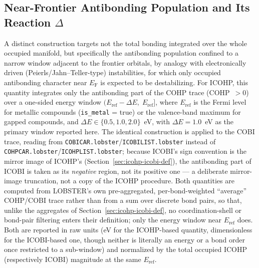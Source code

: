 \documentclass[journal=jpccck,manuscript=article]{achemso}
\begin{document}
\subsection{Near-Frontier Antibonding Population and Its Reaction
$\Delta$}
\label{sec:antibonding-def}

A distinct construction targets not the total bonding integrated over the
whole occupied manifold, but specifically the antibonding population
confined to a narrow window adjacent to the frontier orbitals, by analogy
with electronically driven (Peierls/Jahn--Teller-type) instabilities, for
which only occupied antibonding character near $E_\text{F}$ is expected to
be destabilizing. For ICOHP, this quantity integrates only the antibonding
part of the COHP trace (COHP~$>0$) over a one-sided energy window
$(E_\text{ref}-\Delta E,\; E_\text{ref}]$, where $E_\text{ref}$ is the Fermi
level for metallic compounds (\texttt{is\_metal} = true) or the valence-band
maximum for gapped compounds, and $\Delta E \in \{0.5, 1.0, 2.0\}$~eV, with
$\Delta E = 1.0$~eV as the primary window reported here. The identical
construction is applied to the COBI trace, reading from
\texttt{COBICAR.lobster}/\texttt{ICOBILIST.lobster} instead of
\texttt{COHPCAR.lobster}/\texttt{ICOHPLIST.lobster}; because ICOBI's sign
convention is the mirror image of ICOHP's (Section~\ref{sec:icohp-icobi-def}),
the antibonding part of ICOBI is taken as its \emph{negative} region, not its
positive one --- a deliberate mirror-image truncation, not a copy of the
ICOHP procedure. Both quantities are computed from LOBSTER's own
pre-aggregated, per-bond-weighted ``average'' COHP/COBI trace rather than
from a sum over discrete bond pairs, so that, unlike the aggregates of
Section~\ref{sec:icohp-icobi-def}, no coordination-shell or bond-pair
filtering enters their definition; only the energy window near
$E_\text{ref}$ does. Both are reported in raw units (eV for the ICOHP-based
quantity, dimensionless for the ICOBI-based one, though neither is literally
an energy or a bond order once restricted to a sub-window) and normalized by
the total occupied ICOHP (respectively ICOBI) magnitude at the same
$E_\text{ref}$.
\end{document}
